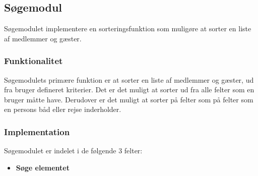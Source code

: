 \subsection{Søgemodul}
\label{sub:s_searchmodul}

Søgemodulet implementere en sorteringsfunktion som muligøre at sorter en liste af medlemmer og gæster. 
\subsubsection{Funktionalitet}
\label{sub:funktionalitet}

Søgemodulets primære funktion er at sorter en liste af medlemmer og gæster, ud fra bruger defineret kriterier. Det er det muligt at sorter ud fra alle felter som en bruger måtte have. Derudover er det muligt at sorter på felter som på felter som en persons båd eller rejse inderholder. 

\subsubsection{Implementation}
\label{sub:implementation}

Søgemodulet er indelet i de følgende 3 felter:

\begin{itemize}
	\item \textbf{Søge elementet} \\
	
\end{itemize}



